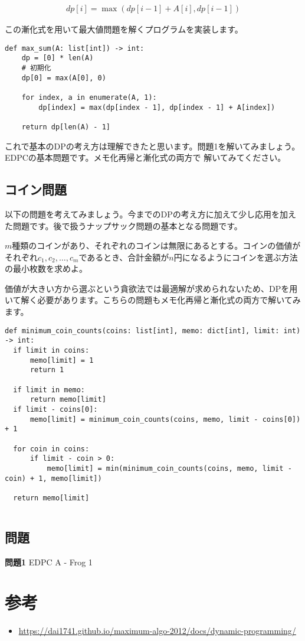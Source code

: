 \documentclass{jlreq}
\begin{document}
\begin{align*}
  dp[i] = \max(dp[i-1] + A[i], dp[i-1])
\end{align*}

この漸化式を用いて最大値問題を解くプログラムを実装します。

\begin{lstlisting}[caption=漸化式を用いた最大値問題の実装, frame=TRBL, label={dp_max}]
def max_sum(A: list[int]) -> int:
    dp = [0] * len(A)
    # 初期化
    dp[0] = max(A[0], 0)
    
    for index, a in enumerate(A, 1):
        dp[index] = max(dp[index - 1], dp[index - 1] + A[index])
    
    return dp[len(A) - 1]
\end{lstlisting}

これで基本のDPの考え方は理解できたと思います。問題1を解いてみましょう。EDPCの基本問題です。メモ化再帰と漸化式の両方で
解いてみてください。

\subsection{コイン問題}
以下の問題を考えてみましょう。今までのDPの考え方に加えて少し応用を加えた問題です。後で扱うナップサック問題の基本となる問題です。

\begin{problem}
  $m$種類のコインがあり、それぞれのコインは無限にあるとする。コインの価値がそれぞれ$c_1, c_2, \ldots, c_m$であるとき、合計金額が$n$円になるようにコインを選ぶ方法の最小枚数を求めよ。
\end{problem}

価値が大きい方から選ぶという貪欲法では最適解が求められないため、DPを用いて解く必要があります。こちらの問題もメモ化再帰と漸化式の両方で解いてみます。

\begin{lstlisting}[caption=メモ化再帰を用いたコイン問題の実装, frame=TRBL, label={memo_coin}]
def minimum_coin_counts(coins: list[int], memo: dict[int], limit: int) -> int:
  if limit in coins:
      memo[limit] = 1
      return 1
  
  if limit in memo:
      return memo[limit]
  if limit - coins[0]:
      memo[limit] = minimum_coin_counts(coins, memo, limit - coins[0]) + 1    
  
  for coin in coins:
      if limit - coin > 0:
          memo[limit] = min(minimum_coin_counts(coins, memo, limit - coin) + 1, memo[limit])

  return memo[limit]
\end{lstlisting}

\begin{lstlisting}[caption=漸化式を用いたコイン問題の実装, frame=TRBL, label={dp_coin}]
\end{lstlisting}

\subsection{問題}
\textbf{問題1} EDPC A - Frog 1\\

\section{参考}
\begin{itemize}
  \item \url{https://dai1741.github.io/maximum-algo-2012/docs/dynamic-programming/}
\end{itemize}
\end{document}
